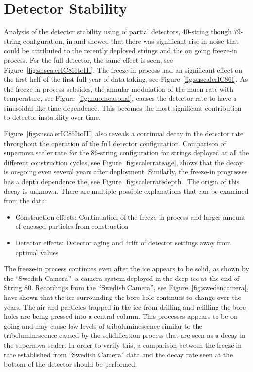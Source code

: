 \section{Detector Stability}

Analysis of the detector stability using of partial detectors, 40-string though 79-string configuration, in \cite{vbaumaster} and \cite{mkrasbergtalk} showed that there was significant rise in noise that could be attributed to the recently deployed strings and the on going freeze-in process. For the full detector, the same effect is seen, see Figure~\ref{fig:snscalerIC86ItoIII}. The freeze-in process had an significant effect on the first half of the first full year of data taking, see Figure~\ref{fig:snscalerIC86I}. As the freeze-in process subsides, the annular modulation of the muon rate with temperature, see Figure~\ref{fig:muonseasonal}, causes the detector rate to have a sinusoidal-like time dependence. This becomes the most significant contribution to detector instability over time. 

Figure~\ref{fig:snscalerIC86ItoIII} also reveals a continual decay in the detector rate throughout the operation of the full detector configuration. Comparison of supernova scaler rate for the 86-string configuration for strings deployed at all the different construction cycles, see Figure~\ref{fig:scalerrateage}, shows that the decay is on-going even several years after deployment. Similarly, the freeze-in progresses has a depth dependence the, see Figure~\ref{fig:scalerratedepth}. The origin of this decay is unknown. There are multiple possible explanations that can be examined from the data:

\begin{itemize}
	\item Construction effects: Continuation of the freeze-in process and larger amount of encased particles from construction
	\item Detector effects: Detector aging and drift of detector settings away from optimal values
\end{itemize}

The freeze-in process continues even after the ice appears to be solid, as shown by the ``Swedish Camera'', a camera system deployed in the deep ice at the end of String 80. Recordings from the ``Swedish Camera'', see Figure~\ref{fig:swedencamera}, have shown that the ice surrounding the bore hole continues to change over the years. The air and particles trapped in the ice from drilling and refilling the bore holes are being pressed into a central column. This processes appears to be on-going and may cause low levels of triboluminescence similar to the triboluminescence caused by the solidification process that are seen as a decay in the supernova scaler. In order to verify this, a comparison between the freeze-in rate established from ``Swedish Camera'' data and the decay rate seen at the bottom of the detector should be performed.

